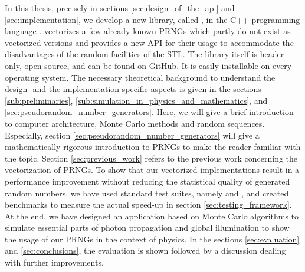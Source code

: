 \documentclass{stdlocal}
\begin{document}
In this thesis, precisely in sections \ref{sec:design_of_the_api} and \ref{sec:implementation}, we develop a new library, called , in the C++ programming language .
 vectorizes a few already known PRNGs which partly do not exist as vectorized versions and provides a new API for their usage to accommodate the disadvantages of the random facilities of the STL.
The library itself is header-only, open-source, and can be found on GitHub.
It is easily installable on every operating system.
The necessary theoretical background to understand the design- and the implementation-specific aspects is given in the sections \ref{sub:preliminaries}, \ref{sub:simulation_in_physics_and_mathematics}, and \ref{sec:pseudorandom_number_generators}.
Here, we will give a brief introduction to computer architecture, Monte Carlo methods and random sequences.
Especially, section \ref{sec:pseudorandom_number_generators} will give a mathematically rigorous introduction to PRNGs to make the reader familiar with the topic.
Section \ref{sec:previous_work} refers to the previous work concerning the vectorization of PRNGs.
To show that our vectorized implementations result in a performance improvement without reducing the statistical quality of generated random numbers, we have used standard test suites, namely  and , and created benchmarks to measure the actual speed-up in section \ref{sec:testing_framework}.
At the end, we have designed an application based on Monte Carlo algorithms to simulate essential parts of photon propagation and global illumination to show the usage of our PRNGs in the context of physics.
In the sections \ref{sec:evaluation} and \ref{sec:conclusions}, the evaluation is shown followed by a discussion dealing with further improvements.
\autocite{dieharder,testu01-lib,testu01}

\end{document}
